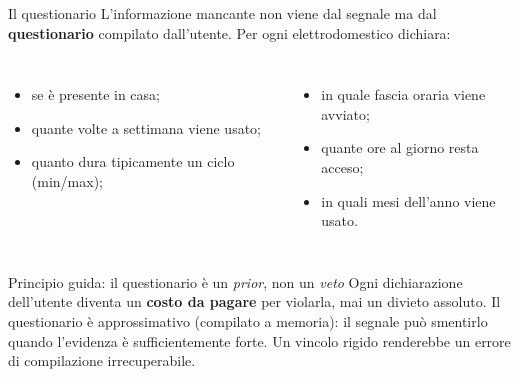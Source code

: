 \documentclass[aspectratio=169]{beamer}
\begin{document}
\begin{frame}{Il questionario}
  L'informazione mancante non viene dal segnale ma dal \textbf{questionario} compilato dall'utente.
  Per ogni elettrodomestico dichiara:
  \begin{columns}[T]
    \begin{itemize}
      \item se \`e presente in casa;
      \item quante volte a settimana viene usato;
      \item quanto dura tipicamente un ciclo (min/max);
    \end{itemize}
    \begin{itemize}
      \item in quale fascia oraria viene avviato;
      \item quante ore al giorno resta acceso;
      \item in quali mesi dell'anno viene usato.
    \end{itemize}
  \end{columns}

  \vspace{0.6em}
  \begin{exampleblock}{Principio guida: il questionario \`e un \emph{prior}, non un \emph{veto}}
    Ogni dichiarazione dell'utente diventa un \textbf{costo da pagare} per violarla, mai un divieto
    assoluto. Il questionario \`e approssimativo (compilato a memoria): il segnale pu\`o smentirlo
    quando l'evidenza \`e sufficientemente forte. Un vincolo rigido renderebbe un errore di
    compilazione irrecuperabile.
  \end{exampleblock}
\end{frame}
\end{document}
